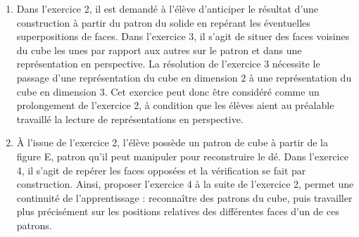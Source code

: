 \begin{enumerate}
   \begin{itemize}
      \item le statut des objets : dans l'exercice 1, on parle d'assemblages de carrés, alors que dans l'exercice 2 on parle de figures ;
      \item la formulation : dans l'exercice 1, la question est fermée, il s'agit de trouver les deux seuls patrons de cube. Dans l'exercice 2, le nombre de solutions n'est pas indiqué ;
      \item la réponse attendue : dans l'exercice 1, les élèves doivent reproduire deux assemblages, alors que dans l'exercice 2, ils doivent reproduire sur papier quadrillé les figures permettant de construire le cube et vérifier en essayant de le construire effectivement.
   \end{itemize}
   {\bf Concernant la vérification :}
   \begin{itemize}
      \item dans l'exercice 1 aucune vérification n'est évoquée ;
      \item à contrario, dans l'exercice 2, l'élève doit vérifier ses propositions par reconstruction du cube à partir des patrons. La reproduction de ces patrons est facilitée par l'utilisation du papier quadrillé.
   \end{itemize}
   \item Dans l'exercice 2, il est demandé à l'élève d'anticiper le résultat d'une construction à partir du patron du solide en repérant les éventuelles superpositions de faces. Dans l'exercice 3, il s'agit de situer des faces voisines du cube les unes par rapport aux autres sur le patron et dans une représentation en perspective. La résolution de l'exercice 3 nécessite le passage d'une représentation du cube en dimension 2 à une représentation du cube en dimension 3. Cet exercice peut donc être considéré comme un prolongement de l'exercice 2, à condition que les élèves aient au préalable travaillé la lecture de représentations en perspective.
   \item À l'issue de l'exercice 2, l'élève possède un patron de cube à partir de la figure E, patron qu'il peut manipuler pour reconstruire le dé. Dans l'exercice 4, il s'agit de repérer les faces opposées et la vérification se fait par construction. Ainsi, proposer l'exercice 4 à la suite de l'exercice 2, permet une continuité de l'apprentissage : reconnaître des patrons du cube, puis travailler plus précisément sur les positions relatives des différentes faces d'un de ces patrons.
\end{enumerate}
